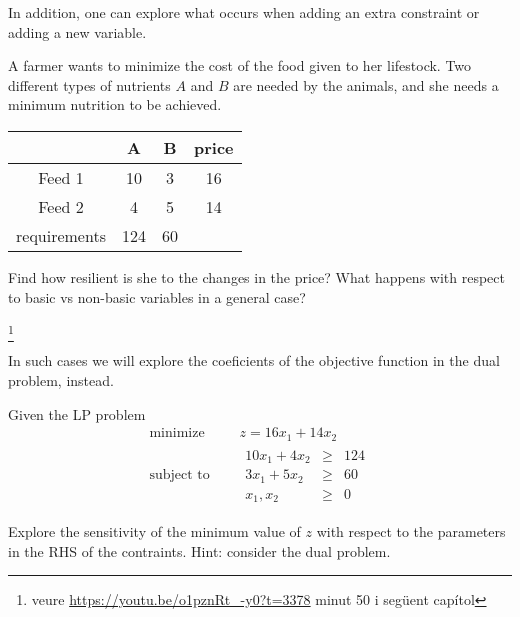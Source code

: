 In addition, one can explore what occurs when adding an extra constraint or adding a new variable.



  \begin{Exercise}
    A farmer wants to minimize the cost of the food given to her lifestock. Two different types of nutrients $A$ and $B$ are needed by the animals, and she needs a minimum nutrition to be achieved.
    \begin{center}
    \begin{tabular}{c|c|c|c}
     & A & B & price\\
     \hline
     Feed 1 & 10 & 3 & 16\\
     Feed 2 & 4 & 5 & 14\\
     \hline
     requirements & 124 & 60 & \\
    \end{tabular}
    \end{center}

    Find how resilient is she to the changes in the price? What happens with respect to basic vs non-basic variables in a general case?

  \end{Exercise}
\footnote{veure  \url{https://youtu.be/o1pznRt_-y0?t=3378} minut 50 i següent capítol}


  In such cases we will explore the coeficients of the objective function in the dual problem, instead.

  \begin{Exercise}
    Given the LP problem
    \begin{equation*}
      \begin{aligned}
        \text{minimize } \quad & z = 16x_1+14x_2 \\
        \text{subject to }\quad &
        \begin{array}{rcl}
          10x_1 + 4x_2 &\geq &124 \\
          3x_1 + 5x_2 &\geq &60 \\
          x_1,x_2 &\geq& 0
        \end{array}
      \end{aligned}
    \end{equation*}

    Explore the sensitivity of the minimum value of $z$ with respect to the parameters in the RHS of the contraints. Hint: consider the dual problem.

  \end{Exercise}





